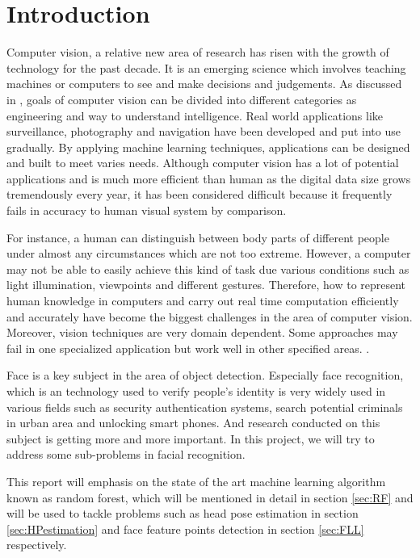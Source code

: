 \chapter{Introduction}
\label {sec:introduction}
Computer vision, a relative new area of research has risen with the growth of technology for the past decade. It is an emerging science which involves teaching machines or computers to see and make decisions and judgements. As discussed in \cite{EGL}, goals of computer vision can be divided into different categories as engineering and way to understand intelligence. Real world applications like surveillance, photography and navigation have been developed and put into use gradually. By applying machine learning techniques, applications can be designed and built to meet varies needs. Although computer vision has a lot of potential applications and is much more efficient than human as the digital data size grows tremendously every year, it has been considered difficult because it frequently fails in accuracy to human visual system by comparison. 

For instance, a human can distinguish between body parts of different people under almost any circumstances which are not too extreme. However, a computer may not be able to easily achieve this kind of task due various conditions such as light illumination, viewpoints and different gestures. Therefore, how to represent human knowledge in computers and carry out real time computation efficiently and accurately have become the biggest challenges in the area of computer vision. Moreover, vision techniques are very domain dependent. Some approaches may fail in one specialized application but work well in other specified areas. \cite{EGL}. 

Face is a key subject in the area of object detection. Especially face recognition, which is an technology used to verify people's identity is very widely used in various fields such as security authentication systems, search potential criminals in urban area and unlocking smart phones. And research conducted on this subject is getting more and more important. In this project, we will try to address some sub-problems in facial recognition.

This report will emphasis on the state of the art machine learning algorithm known as random forest, which will be mentioned in detail in section \ref{sec:RF} and will be used to tackle problems such as head pose estimation in section \ref{sec:HPestimation} and face feature points detection in section \ref{sec:FLL} respectively.
